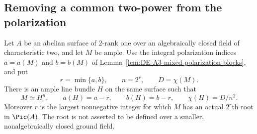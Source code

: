 \subsection{Removing a common two-power from the polarization}

\begin{lemma}
\label{lem:DE-A3-mixed-common-power-root}
Let $A$ be an abelian surface of $2$-rank one over an algebraically
closed field of characteristic two, and let $M$ be ample.  Use the
integral polarization indices $a=a(M)$ and $b=b(M)$ of
Lemma~\ref{lem:DE-A3-mixed-polarization-blocks}, and put
\[
             r=\min\{a,b\},\qquad n=2^r,\qquad D=\chi(M).
\]
There is an ample line bundle $H$ on the same surface such that
\[
 M\simeq H^n,\qquad
 a(H)=a-r,\qquad b(H)=b-r,\qquad \chi(H)=D/n^2.
                                                        \tag{DE-CP1}
\]
Moreover $r$ is the largest nonnegative integer for which $M$ has
an actual $2^r$th root in $\Pic(A)$.  The root is not asserted to be
defined over a smaller, nonalgebraically closed ground field.
\end{lemma}
